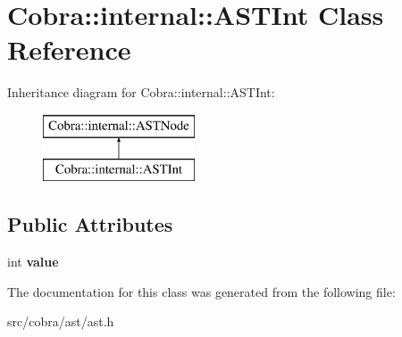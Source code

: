 \hypertarget{class_cobra_1_1internal_1_1_a_s_t_int}{\section{Cobra\+:\+:internal\+:\+:A\+S\+T\+Int Class Reference}
\label{class_cobra_1_1internal_1_1_a_s_t_int}
}
Inheritance diagram for Cobra\+:\+:internal\+:\+:A\+S\+T\+Int\+:\begin{figure}[H]
\begin{center}
\leavevmode
\includegraphics[height=2.000000cm]{class_cobra_1_1internal_1_1_a_s_t_int}
\end{center}
\end{figure}
\subsection*{Public Attributes}
\begin{DoxyCompactItemize}
\item 
\hypertarget{class_cobra_1_1internal_1_1_a_s_t_int_a6ef1cdf248b70931f64345d3b37c4d77}{int {\bfseries value}}\label{class_cobra_1_1internal_1_1_a_s_t_int_a6ef1cdf248b70931f64345d3b37c4d77}

\end{DoxyCompactItemize}


The documentation for this class was generated from the following file\+:\begin{DoxyCompactItemize}
\item 
src/cobra/ast/ast.\+h\end{DoxyCompactItemize}
